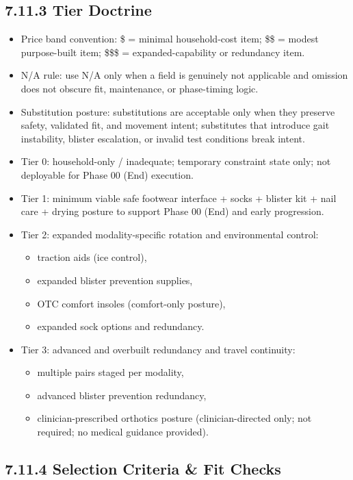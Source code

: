\documentclass[10pt]{article}
\begin{document}
\subsection*{7.11.3 Tier Doctrine}
{}

\begin{itemize}
\item Price band convention: \$ = minimal household-cost item; \$\$ = modest purpose-built item; \$\$\$ = expanded-capability or redundancy item.
\item N/A rule: use N/A only when a field is genuinely not applicable and omission does not obscure fit, maintenance, or phase-timing logic.
\item Substitution posture: substitutions are acceptable only when they preserve safety, validated fit, and movement intent; substitutes that introduce gait instability, blister escalation, or invalid test conditions break intent.
\item Tier 0: household-only / inadequate; temporary constraint state only; not deployable for Phase 00 (End) execution.
\item Tier 1: minimum viable safe footwear interface + socks + blister kit + nail care + drying posture to support Phase 00 (End) and early progression.
\item Tier 2: expanded modality-specific rotation and environmental control:
  \begin{itemize}
  \item traction aids (ice control),
  \item expanded blister prevention supplies,
  \item OTC comfort insoles (comfort-only posture),
  \item expanded sock options and redundancy.
  \end{itemize}
\item Tier 3: advanced and overbuilt redundancy and travel continuity:
  \begin{itemize}
  \item multiple pairs staged per modality,
  \item advanced blister prevention redundancy,
  \item clinician-prescribed orthotics posture (clinician-directed only; not required; no medical guidance provided).
  \end{itemize}
\end{itemize}

\subsection*{7.11.4 Selection Criteria \& Fit Checks}
{}
\end{document}
